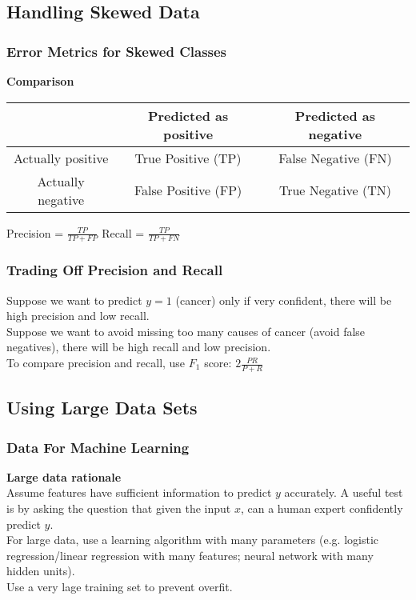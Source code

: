 \documentclass{article}
\newcommand\tab[1][1cm]{\hspace*{#1}}
\begin{document}
\subsection{Handling Skewed Data}
\subsubsection{Error Metrics for Skewed Classes}
\begin{center}
\textbf{Comparison} \\
\begin{tabular}{ | c | c | c | }
\hline
 & Predicted as positive & Predicted as negative \\ 
\hline
Actually positive & True Positive (TP) & False Negative (FN) \\  
\hline
Actually negative & False Positive (FP) & True Negative (TN) \\
\hline
\end{tabular}
\end{center}

\begin{center}
Precision = $\frac{TP}{TP + FP}$ \tab Recall = $\frac{TP}{TP + FN}$ \\
\end{center}

\subsubsection{Trading Off Precision and Recall}
Suppose we want to predict $y = 1$ (cancer) only if very confident, there will be high precision and low recall. \\
Suppose we want to avoid missing too many causes of cancer (avoid false negatives), there will be high recall and low precision. \\
To compare precision and recall, use $F_1$ score: $2\frac{PR}{P+R}$

\subsection{Using Large Data Sets}
\subsubsection{Data For Machine Learning}
\textbf{Large data rationale}\\

Assume features have sufficient information to predict $y$ accurately. A useful test is by asking the question that given the input $x$, can a human expert confidently predict $y$.\\

For large data, use a learning algorithm with many parameters (e.g. logistic regression/linear regression with many features; neural network with many hidden units). \\

Use a very lage training set to prevent overfit.\\
\end{document}
